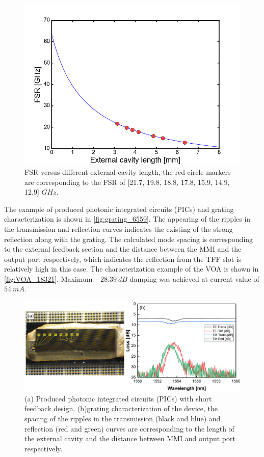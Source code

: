 \begin{figure}[H]
    \centering
    \includegraphics[width=.7\linewidth]{figures/design_FSR.png}
    \caption{FSR versus different external cavity length, the red circle markers are corresponding to the FSR of [21.7, 19.8, 18.8, 17.8, 15.9, 14.9, 12.9] $GHz$.}
    \label{fig:design_FSR}
\end{figure}

The example of produced photonic integrated circuits (PICs) and grating characterization is shown in \autoref{fig:grating_6559}. The appearing of the ripples in the transmission and reflection curves indicates the existing of the strong reflection along with the grating. The calculated mode spacing is corresponding to the external feedback section and the distance between the MMI and the output port respectively, which indicates the reflection from the TFF slot is relatively high in this case. The characterization example of the VOA is shown in \autoref{fig:VOA_18321}. Maximum $-28.39 \ dB$ damping was achieved at current value of $54 \ mA$. 

\begin{figure}[H]
    \centering
    \includegraphics[width=\linewidth]{figures/grating_6559.png}
    \caption{(a) Produced photonic integrated circuits (PICs) with short feedback design, (b)grating characterization of the device, the spacing of the ripples in the transmission (black and blue) and reflection (red and green) curves are corresponding to the length of the external cavity and the distance between MMI and output port respectively.}
    \label{fig:grating_6559}
\end{figure}

